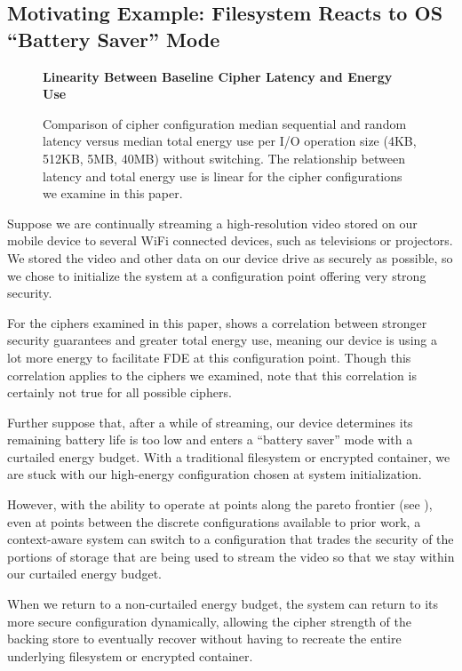 \subsection{Motivating Example: Filesystem Reacts to OS ``Battery Saver'' Mode}

\begin{figure}[ht] \textbf{Linearity Between Baseline Cipher Latency and Energy
Use}\par\medskip
   \centering
   {} \caption{Comparison of cipher
   configuration median sequential and random latency versus median total energy
   use per I/O operation size (4KB, 512KB, 5MB, 40MB) without switching. The
   relationship between latency and total energy use is linear for the cipher
   configurations we examine in this paper.}
  \label{fig:linearity-latency-energy}
\end{figure}

Suppose we are continually streaming a high-resolution video stored on our
mobile device to several WiFi connected devices, such as televisions or
projectors. We stored the video and other data on our device drive as securely
as possible, so we chose to initialize the system at a configuration point
offering very strong security.

For the ciphers examined in this paper,  shows
a correlation between stronger security guarantees and greater total energy use,
meaning our device is using a lot more energy to facilitate FDE at this
configuration point. Though this correlation applies to the ciphers we examined,
note that this correlation is certainly not true for all possible ciphers.

Further suppose that, after a while of streaming, our device determines its
remaining battery life is too low and enters a ``battery saver'' mode with a
curtailed energy budget. With a traditional filesystem or encrypted container,
we are stuck with our high-energy configuration chosen at system initialization.

However, with the ability to operate at points along the pareto frontier (see
), even at points between the discrete configurations
available to prior work, a context-aware system can switch to a configuration
that trades the security of the portions of storage that are being used to
stream the video so that we stay within our curtailed energy budget.

When we return to a non-curtailed energy budget, the system can return to its
more secure configuration dynamically, allowing the cipher strength of the
backing store to eventually recover without having to recreate the entire
underlying filesystem or encrypted container.

